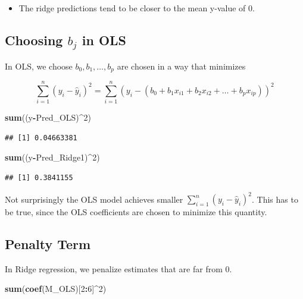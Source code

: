 \documentclass[]{book}
\newenvironment{Shaded}{\begin{snugshade}}{\end{snugshade}}
\newcommand{\KeywordTok}[1]{\textcolor[rgb]{0.13,0.29,0.53}{\textbf{#1}}}
\newcommand{\DecValTok}[1]{\textcolor[rgb]{0.00,0.00,0.81}{#1}}
\newcommand{\OperatorTok}[1]{\textcolor[rgb]{0.81,0.36,0.00}{\textbf{#1}}}
\newcommand{\NormalTok}[1]{#1}
\providecommand{\tightlist}{%
  \setlength{\itemsep}{0pt}\setlength{\parskip}{0pt}}
\begin{document}
\begin{itemize}
\tightlist
\item
  The ridge predictions tend to be closer to the mean y-value of 0.
\end{itemize}

\subsection{\texorpdfstring{Choosing \(b_j\) in
OLS}{Choosing b\_j in OLS}}\label{choosing-b_j-in-ols}

In OLS, we choose \(b_0, b_1, \ldots, b_p\) are chosen in a way that
minimizes

\[ \displaystyle\sum_{i=1}^n (y_i -\hat{y}_i)^2  = \displaystyle\sum_{i=1}^n (y_i -(b_0 + b_1x_{i1} + b_2x_{i2} + \ldots + b_px_{ip}))^2 \]

\begin{Shaded}
\begin{Highlighting}[]
\KeywordTok{sum}\NormalTok{((y}\OperatorTok{-}\NormalTok{Pred_OLS)}\OperatorTok{^}\DecValTok{2}\NormalTok{)}
\end{Highlighting}
\end{Shaded}

\begin{verbatim}
## [1] 0.04663381
\end{verbatim}

\begin{Shaded}
\begin{Highlighting}[]
\KeywordTok{sum}\NormalTok{((y}\OperatorTok{-}\NormalTok{Pred_Ridge1)}\OperatorTok{^}\DecValTok{2}\NormalTok{)}
\end{Highlighting}
\end{Shaded}

\begin{verbatim}
## [1] 0.3841155
\end{verbatim}

Not surprisingly the OLS model achieves smaller
\(\displaystyle\sum_{i=1}^n (y_i -\hat{y}_i)^2\). This has to be true,
since the OLS coefficients are chosen to minimize this quantity.

\subsection{Penalty Term}\label{penalty-term}

In Ridge regression, we penalize estimates that are far from 0.

\begin{Shaded}
\begin{Highlighting}[]
\KeywordTok{sum}\NormalTok{(}\KeywordTok{coef}\NormalTok{(M_OLS)[}\DecValTok{2}\OperatorTok{:}\DecValTok{6}\NormalTok{]}\OperatorTok{^}\DecValTok{2}\NormalTok{)}
\end{Highlighting}
\end{Shaded}
\end{document}
